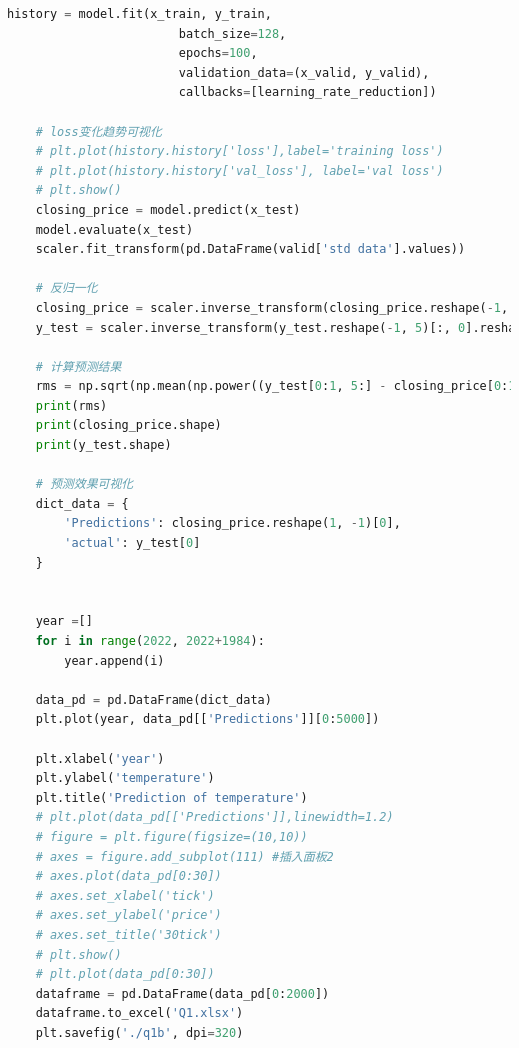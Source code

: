 \documentclass{apmcmthesis}
\begin{document}
\begin{lstlisting}[language=python, caption={The python source code of LSTM}]
    history = model.fit(x_train, y_train,
                        batch_size=128,
                        epochs=100,
                        validation_data=(x_valid, y_valid),
                        callbacks=[learning_rate_reduction])
    
    # loss变化趋势可视化
    # plt.plot(history.history['loss'],label='training loss')
    # plt.plot(history.history['val_loss'], label='val loss')
    # plt.show()
    closing_price = model.predict(x_test)
    model.evaluate(x_test)
    scaler.fit_transform(pd.DataFrame(valid['std data'].values))
    
    # 反归一化
    closing_price = scaler.inverse_transform(closing_price.reshape(-1, 5)[:, 0].reshape(1, -1))  # 只取第一列
    y_test = scaler.inverse_transform(y_test.reshape(-1, 5)[:, 0].reshape(1, -1))
    
    # 计算预测结果
    rms = np.sqrt(np.mean(np.power((y_test[0:1, 5:] - closing_price[0:1, 5:]), 2)))
    print(rms)
    print(closing_price.shape)
    print(y_test.shape)
    
    # 预测效果可视化
    dict_data = {
        'Predictions': closing_price.reshape(1, -1)[0],
        'actual': y_test[0]
    }
    
    
    year =[]
    for i in range(2022, 2022+1984):
        year.append(i)
    
    data_pd = pd.DataFrame(dict_data)
    plt.plot(year, data_pd[['Predictions']][0:5000])
    
    plt.xlabel('year')
    plt.ylabel('temperature')
    plt.title('Prediction of temperature')
    # plt.plot(data_pd[['Predictions']],linewidth=1.2)
    # figure = plt.figure(figsize=(10,10))
    # axes = figure.add_subplot(111) #插入面板2
    # axes.plot(data_pd[0:30])
    # axes.set_xlabel('tick')
    # axes.set_ylabel('price')
    # axes.set_title('30tick')
    # plt.show()
    # plt.plot(data_pd[0:30])
    dataframe = pd.DataFrame(data_pd[0:2000])
    dataframe.to_excel('Q1.xlsx')
    plt.savefig('./q1b', dpi=320)
  \end{lstlisting}
  
\end{document}
